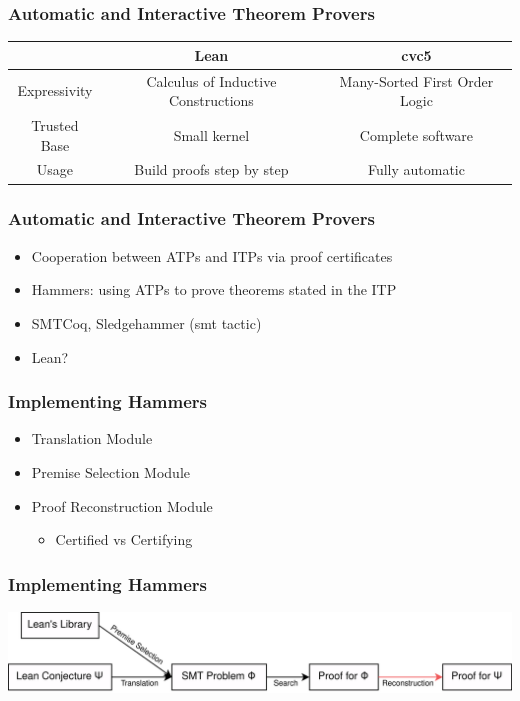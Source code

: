 \documentclass[usepdftitle=false,aspectratio=169,usenames,dvipsnames]{beamer}
\newcommand\vitem{\vfill\item}
\begin{document}
\begin{frame}
  \frametitle{Automatic and Interactive Theorem Provers}
  \begin{table}[]
  \begin{tabular}{|c|c|c|}
  \hline
              & \textbf{Lean}                                & \textbf{cvc5}                          \\ \hline
  Expressivity & Calculus of Inductive Constructions & Many-Sorted First Order Logic \\
  Trusted Base & Small kernel                        & Complete software             \\
  Usage        & Build proofs step by step           & Fully automatic               \\ \hline
  \end{tabular}
  \end{table}
\end{frame}


\begin{frame}
  \frametitle{Automatic and Interactive Theorem Provers}
  \begin{itemize}
    \item Cooperation between ATPs and ITPs via proof certificates
    \vitem Hammers: using ATPs to prove theorems stated in the ITP
    \vitem SMTCoq, Sledgehammer (smt tactic)
    \vitem Lean?
  \end{itemize}
\end{frame}

\begin{frame}
  \frametitle{Implementing Hammers}
  \begin{minipage}[c][0.55 \textheight]{0.45 \textwidth}
    \begin{itemize}
      \item Translation Module
      \vitem Premise Selection Module
      \vitem Proof Reconstruction Module
      \begin{itemize}
        \item{Certified vs Certifying}
      \end{itemize}
    \end{itemize}
  \end{minipage}
  \begin{minipage}{0.44 \textwidth}
  \end{minipage}
\end{frame}

\begin{frame}
  \frametitle{Implementing Hammers}
  \centering
  \includegraphics[height=0.26\textheight]{images/pic7.png}
\end{frame}
\end{document}

